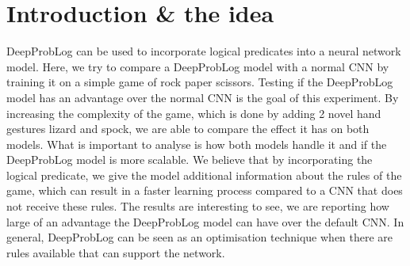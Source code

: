 \section{Introduction \& the idea}
DeepProbLog \cite{DBLP} can be used to incorporate logical predicates into a neural network model. Here, we try to compare a DeepProbLog model with a normal CNN by training it on a simple game of rock paper scissors. Testing if the DeepProbLog model has an advantage over the normal CNN is the goal of this experiment. By increasing the complexity of the game, which is done by adding 2 novel hand gestures lizard and spock, we are able to compare the effect it has on both models. What is important to analyse is how both models handle it and if the DeepProbLog model is more scalable. We believe that by incorporating the logical predicate, we give the model additional information about the rules of the game, which can result in a faster learning process compared to a CNN that does not receive these rules. The results are interesting to see, we are reporting how large of an advantage the DeepProbLog model can have over the default CNN. In general, DeepProbLog can be seen as an optimisation technique when there are rules available that can support the network.
